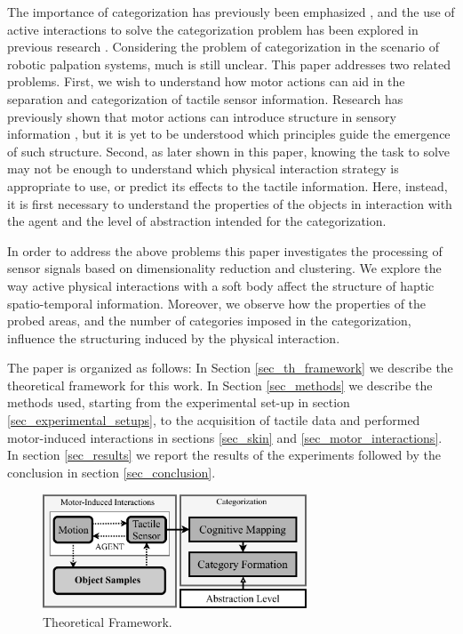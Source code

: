 \documentclass[]{interact}
\theoremstyle{plain}%
\theoremstyle{definition}
\theoremstyle{remark}
\begin{document}
The importance of categorization has previously been emphasized \cite{hoffmann2012implications}, and the use of active 
interactions to solve the categorization problem has been explored in previous research 
\cite{pfeifer1997, nolfi2002active, tuci2009dynamics}. 
Considering the problem of categorization in the scenario of robotic palpation systems, much is still unclear. 
This paper addresses two related problems. First, we wish to understand 
how motor actions can aid in the separation and categorization of tactile sensor information. Research has 
previously shown that motor actions can introduce structure in sensory information 
\cite{lungarella2005methods, sporns2006evolving, pfeifer2007information}, but it is yet to be understood 
which principles guide the emergence of such structure. Second, as later shown in this paper, 
knowing the task to solve may not be enough to understand which physical interaction strategy is appropriate to use, 
or predict its effects to the tactile information. Here, instead, it is first necessary to understand the properties 
of the objects in interaction with the agent and the level of abstraction intended for the categorization.

In order to address the above problems this paper investigates the processing of sensor signals based on dimensionality 
reduction and clustering. We explore the way active physical interactions with a soft body affect the structure of 
haptic spatio-temporal information. Moreover, we observe how the properties of the probed areas, and the number of 
categories imposed in the categorization, influence the structuring induced by the physical interaction. 

The paper is organized as follows: In Section \ref{sec_th_framework} we describe the theoretical framework for this work. 
In Section \ref{sec_methods} we describe the methods used, starting from the experimental 
set-up in section \ref{sec_experimental_setups}, to the acquisition of tactile data and performed motor-induced interactions 
in sections \ref{sec_skin} and \ref{sec_motor_interactions}. In section \ref{sec_results} we report the results of the experiments 
followed by the conclusion in section  \ref{sec_conclusion}.

\begin{figure}[]
	\centering
	\includegraphics[width=0.7\textwidth]{./figs/conceptual_framework}
	\caption{Theoretical Framework.}
	\label{conceptual_map}
\end{figure}
\end{document}
